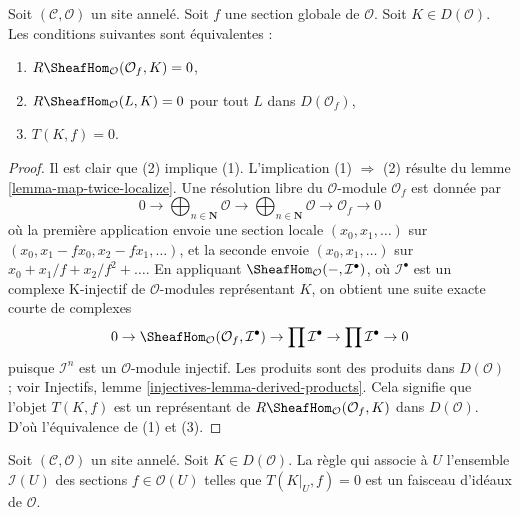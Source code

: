 \begin{lemma}
\label{lemma-hom-from-Af}
Soit $(\mathcal{C}, \mathcal{O})$ un site annelé. Soit $f$ une section
globale de $\mathcal{O}$. Soit $K \in D(\mathcal{O})$.
Les conditions suivantes sont équivalentes :
\begin{enumerate}
\item $R\SheafHom_\mathcal{O}(\mathcal{O}_f, K) = 0$,
\item $R\SheafHom_\mathcal{O}(L, K) = 0$ pour tout $L$ dans $D(\mathcal{O}_f)$,
\item $T(K, f) = 0$.
\end{enumerate}
\end{lemma}

\begin{proof}
Il est clair que (2) implique (1). L'implication (1) $\Rightarrow$ (2)
résulte du lemme \ref{lemma-map-twice-localize}.
Une résolution libre du $\mathcal{O}$-module $\mathcal{O}_f$ est donnée par
$$
0 \to \bigoplus\nolimits_{n \in \mathbf{N}} \mathcal{O} \to
\bigoplus\nolimits_{n \in \mathbf{N}} \mathcal{O}
\to \mathcal{O}_f \to 0
$$
où la première application envoie une section locale $(x_0, x_1, \ldots)$ sur
$(x_0, x_1 - fx_0, x_2 - fx_1, \ldots)$, et la seconde envoie
$(x_0, x_1, \ldots)$ sur $x_0 + x_1/f + x_2/f^2 + \ldots$.
En appliquant $\SheafHom_\mathcal{O}(-, \mathcal{I}^\bullet)$,
où $\mathcal{I}^\bullet$ est un complexe K-injectif de $\mathcal{O}$-modules
représentant $K$, on obtient une suite exacte courte de complexes
$$
0 \to \SheafHom_\mathcal{O}(\mathcal{O}_f, \mathcal{I}^\bullet) \to
\prod \mathcal{I}^\bullet \to \prod \mathcal{I}^\bullet \to 0
$$
puisque $\mathcal{I}^n$ est un $\mathcal{O}$-module injectif.
Les produits sont des produits dans $D(\mathcal{O})$ ; voir
Injectifs, lemme \ref{injectives-lemma-derived-products}.
Cela signifie que l'objet $T(K, f)$ est un représentant de
$R\SheafHom_\mathcal{O}(\mathcal{O}_f, K)$ dans $D(\mathcal{O})$.
D'où l'équivalence de (1) et (3).
\end{proof}

\begin{lemma}
\label{lemma-ideal-of-elements-complete-wrt}
Soit $(\mathcal{C}, \mathcal{O})$ un site annelé. Soit $K \in D(\mathcal{O})$.
La règle qui associe à $U$ l'ensemble $\mathcal{I}(U)$
des sections $f \in \mathcal{O}(U)$ telles que $T(K|_U, f) = 0$
est un faisceau d'idéaux de $\mathcal{O}$.
\end{lemma}

